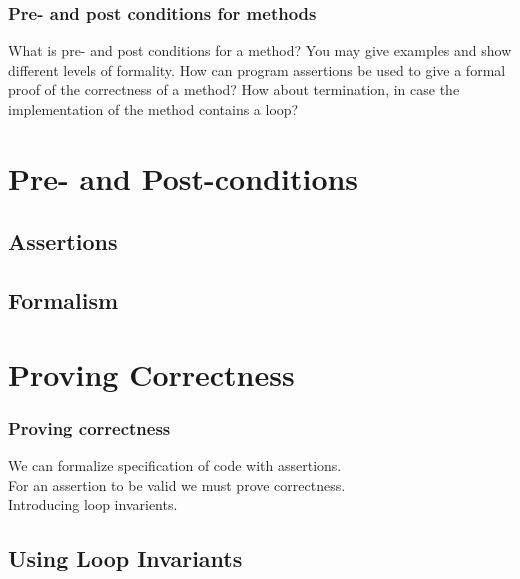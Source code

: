 

\begin{frame}
    \frametitle{Pre- and post conditions for methods}

    What is pre- and post conditions for a method? You may give examples and
    show different levels of formality. How can program assertions be used to
    give a formal proof of the correctness of a method? How about termination,
    in case the implementation of the method contains a loop?
\end{frame}

\section{Pre- and Post-conditions}

\subsection{Assertions}





\subsection{Formalism}



\section{Proving Correctness}

\begin{frame}[fragile]
    \frametitle{Proving correctness}
    We can formalize specification of code with assertions.\\

    For an assertion to be valid we must prove correctness.\\

    Introducing loop invarients.
\end{frame}

\subsection{Using Loop Invariants}





